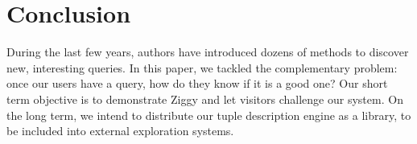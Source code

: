 \section{Conclusion}
\label{sec:conclusion}
During the last few years, authors have introduced dozens of methods to
discover new, interesting queries. In this paper, we tackled the complementary
problem: once our users have a query, how do they know if it is a good one?
Our short term objective is to demonstrate Ziggy and let visitors challenge our
system. On the long term, we intend to distribute our tuple description engine
as a library, to be included into external exploration systems.

